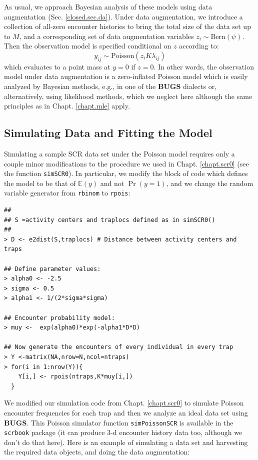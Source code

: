 As usual, we approach Bayesian analysis of these models using data
augmentation (Sec. \ref{closed.sec.da}).  Under data augmentation, we
introduce a collection of all-zero encounter histories to bring the
total size of the data set up to $M$, and a corresponding set of data
augmentation variables $z_{i} \sim \mbox{Bern}(\psi)$. Then the
observation model is specified conditional on $z$ according to:
\[
y_{ij} \sim  \mbox{Poisson}(z_{i} K  \lambda_{ij})
\]
which evaluates to a point mass at $y=0$ if $z=0$.  In other words,
the observation model under data augmentation is a zero-inflated
Poisson model which is easily analyzed by Bayesian methods, e.g., in
one of the {\bf BUGS} dialects or, alternatively, using likelihood
methods, which we neglect here although the same principles as in
Chapt. \ref{chapt.mle} apply.


\subsection{Simulating Data and Fitting the Model}


Simulating a sample SCR data set under the Poisson model requires only
a couple minor modifications to the procedure we used in
Chapt. \ref{chapt.scr0} (see the function \mbox{\tt simSCR0}). In
particular, we modify the block of code which defines the model to be
that of $\mathbb{E}(y)$ and not $\Pr(y=1)$, and we change the random
variable generator from \mbox{\tt rbinom} to \mbox{\tt rpois}:
\begin{samepage}
{\small
\begin{verbatim}
##
## S =activity centers and traplocs defined as in simSCR0()
##
> D <- e2dist(S,traplocs) # Distance between activity centers and traps

## Define parameter values:
> alpha0 <- -2.5
> sigma <- 0.5
> alpha1 <- 1/(2*sigma*sigma)

## Encounter probability model:
> muy <-  exp(alpha0)*exp(-alpha1*D*D)

## Now generate the encounters of every individual in every trap
> Y <-matrix(NA,nrow=N,ncol=ntraps)
> for(i in 1:nrow(Y)){
    Y[i,] <- rpois(ntraps,K*muy[i,])
  }
\end{verbatim}
}
\end{samepage}

We modified our simulation code from Chapt. \ref{chapt.scr0} to
simulate Poisson encounter frequencies for each trap and then we
analyze an ideal data set using {\bf BUGS}. This Poisson simulator
function {\tt simPoissonSCR} is available in the \mbox{\tt scrbook}
package (it can produce 3-d encounter history data too, although we
don't do that here).  Here is an example of simulating a data set and
harvesting the required data objects, and doing the data augmentation:

